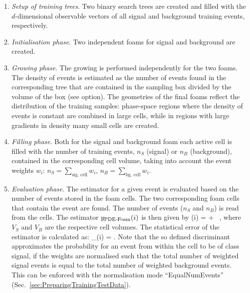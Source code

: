 \begin{enumerate}
  \item \emph{Setup of training trees}. Two binary search trees are
    created and filled with the $d$-dimensional observable vectors of
    all signal and background training events, respectively.

  \item \emph{Initialisation phase}. Two independent foams for signal
    and background are created.

  \item \emph{Growing phase}. The growing is performed independently
    for the two foams.  The density of events is estimated as the
    number of events found in the corresponding tree that are
    contained in the sampling box divided by the volume of the box
    (see  option).  The geometries of the final foams
    reflect the distribution of the training samples: phase-space
    regions where the density of events is constant are combined in
    large cells, while in regions with large gradients in density many
    small cells are created.

  \item \emph{Filling phase}. Both for the signal and background foam
    each active cell is filled with the number of training
    events, $n_S$ (signal) or $n_B$ (background), contained in the 
    corresponding cell volume, taking into account
    the event weights $w_i$: $n_S=\sum_{\text{sig. cell}}w_i$, 
    $n_B=\sum_{\text{bg. cell}}w_i$. 

  \item \emph{Evaluation phase}. The estimator for a given event is
    evaluated based on the number of events stored in the foam
    cells. The two corresponding foam cells that contain the event are
    found.  The number of events ($n_S$ and $n_B$) is
    read from the cells.  The estimator $ y_\text{\mbox{PDE-Foam}}(i)$ is then given by
    \beq
    \label{eq:PDEFoamSeparatedRatio}
    \RPDEFoam(i) = 
    { + 
      } \, , 
    \eeq
    where $V_S$ and $V_B$ are the respective
    cell volumes.
    The statistical error of the estimator is calculated as:
    \beq
    \label{eq:PDEFoamSeparatedError}
    \sigma_{\RPDEFoam}(i) = .
    \eeq
    Note that the so defined discriminant approximates the probability for an event
    from within the cell to be of class signal, if the weights are normalised such
    that the total number of weighted signal events is equal to the total number of weighted
    background events. This can be enforced with the normalisation mode ``EqualNumEvents''
    (\cf Sec.~\ref{sec:PreparingTrainingTestData}).
\end{enumerate}

